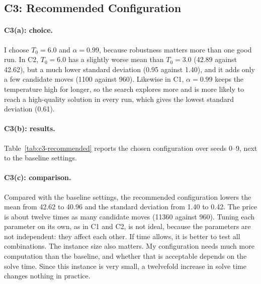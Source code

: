 \documentclass[11pt]{article}
\begin{document}
\subsection*{C3: Recommended Configuration}

\paragraph{C3(a): choice.}
I choose $T_0 = 6.0$ and $\alpha = 0.99$, because robustness matters more than one good run. In C2, $T_0 = 6.0$ has a slightly worse mean than $T_0 = 3.0$ (42.89 against 42.62), but a much lower standard deviation (0.95 against 1.40), and it adds only a few candidate moves (1100 against 960). Likewise in C1, $\alpha = 0.99$ keeps the temperature high for longer, so the search explores more and is more likely to reach a high-quality solution in every run, which gives the lowest standard deviation (0.61).

\paragraph{C3(b): results.}
Table~\ref{tab:c3-recommended} reports the chosen configuration over seeds 0--9, next to the baseline settings.

\begin{table}[H]
    \centering
    
    \caption{C3: recommended configuration ($T_0 = 6.0$, $\alpha = 0.99$) against the baseline settings ($T_0 = 3.0$, $\alpha = 0.90$) over seeds 0--9 ($T_{min} = 0.02$, cooling every 20 candidate moves).}
    \label{tab:c3-recommended}
\end{table}

\paragraph{C3(c): comparison.}
Compared with the baseline settings, the recommended configuration lowers the mean from 42.62 to 40.96 and the standard deviation from 1.40 to 0.42. The price is about twelve times as many candidate moves (11360 against 960). Tuning each parameter on its own, as in C1 and C2, is not ideal, because the parameters are not independent: they affect each other. If time allows, it is better to test all combinations. The instance size also matters. My configuration needs much more computation than the baseline, and whether that is acceptable depends on the solve time. Since this instance is very small, a twelvefold increase in solve time changes nothing in practice.
\end{document}
